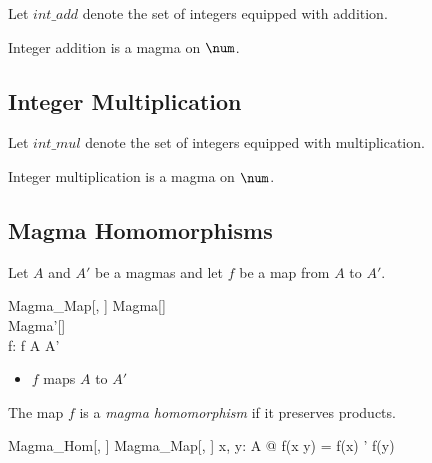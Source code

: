 \documentclass{amsart}
\begin{document}
Let $int\_add$ denote the set of integers equipped with addition.

\begin{example}
Integer addition is a magma on $\num$.
\end{example}

\subsection{Integer Multiplication}

Let $int\_mul$ denote the set of integers equipped with multiplication.

\begin{example}
Integer multiplication is a magma on $\num$.
\end{example}

\subsection{Magma Homomorphisms}

Let $A$ and $A'$ be a magmas and let $f$ be a map from $A$ to $A'$.

\begin{schema}{Magma\_Map}[\genT, \genU]
	Magma[\genT] \\
	Magma'[\genU] \\
	f: \genT \pfun \genU
\where
	f \in A \fun A'
\end{schema}

\begin{itemize}
	\item $f$ maps $A$ to $A'$
\end{itemize}

The map $f$ is a \textit{magma homomorphism} if it preserves products.

\begin{schema}{Magma\_Hom}[\genT, \genU]
	Magma\_Map[\genT, \genU]
\where
	\forall x, y: A @ f(x \circ y) = f(x) \circ' f(y)
\end{schema}
\end{document}
